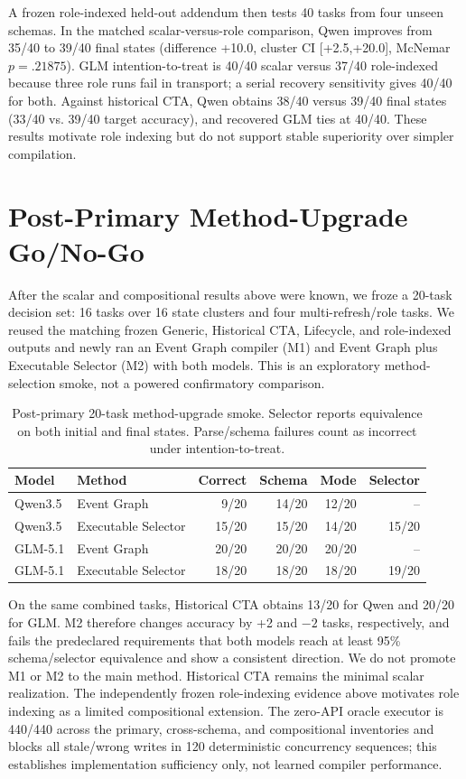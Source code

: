 \documentclass[10pt]{article}
\begin{document}
A frozen role-indexed held-out addendum then tests 40 tasks from four unseen schemas. In the
matched scalar-versus-role comparison, Qwen improves from 35/40 to 39/40 final states
(difference +10.0, cluster CI [+2.5,+20.0], McNemar $p=.21875$). GLM intention-to-treat is
40/40 scalar versus 37/40 role-indexed because three role runs fail in transport; a serial
recovery sensitivity gives 40/40 for both. Against historical CTA, Qwen obtains 38/40 versus
39/40 final states (33/40 vs. 39/40 target accuracy), and recovered GLM ties at 40/40. These results
motivate role indexing but do not support stable superiority over simpler compilation.

\section{Post-Primary Method-Upgrade Go/No-Go}
After the scalar and compositional results above were known, we froze a 20-task decision set:
16 \NewSchemaReplication{} tasks over 16 state clusters and four multi-refresh/role tasks. We reused the
matching frozen Generic, Historical CTA, Lifecycle, and role-indexed outputs and newly ran an Event
Graph compiler (M1) and Event Graph plus Executable Selector (M2) with both models. This is an
exploratory method-selection smoke, not a powered confirmatory comparison.

\begin{table}[h]
\centering
\small
\begin{tabular}{llrrrr}
\toprule
Model & Method & Correct & Schema & Mode & Selector \\
\midrule
Qwen3.5 & Event Graph & 9/20 & 14/20 & 12/20 & -- \\
Qwen3.5 & Executable Selector & 15/20 & 15/20 & 14/20 & 15/20 \\
GLM-5.1 & Event Graph & 20/20 & 20/20 & 20/20 & -- \\
GLM-5.1 & Executable Selector & 18/20 & 18/20 & 18/20 & 19/20 \\
\bottomrule
\end{tabular}
\caption{Post-primary 20-task method-upgrade smoke. Selector reports equivalence on both initial
and final states. Parse/schema failures count as incorrect under intention-to-treat.}
\end{table}

On the same combined tasks, Historical CTA obtains 13/20 for Qwen and 20/20 for GLM. M2 therefore
changes accuracy by +2 and $-2$ tasks, respectively, and fails the predeclared requirements that
both models reach at least 95\% schema/selector equivalence and show a consistent direction.
We do not promote M1 or M2 to the main method. Historical CTA remains the minimal scalar realization.
The independently frozen role-indexing evidence above motivates role indexing as a limited
compositional extension. The zero-API oracle executor is 440/440 across the primary, cross-schema,
and compositional inventories and blocks all stale/wrong writes in 120 deterministic concurrency
sequences; this establishes implementation sufficiency only,
not learned compiler performance.
\end{document}
